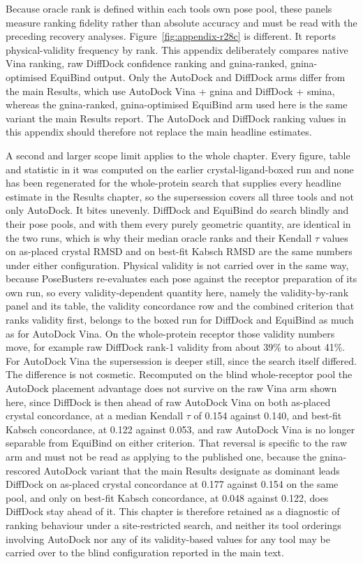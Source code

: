 Because oracle rank is defined within each tool\textquotesingle s own pose pool, these panels measure ranking fidelity rather than absolute accuracy and must be read with the preceding recovery analyses. Figure~\ref{fig:appendix-r28c} is different. It reports physical-validity frequency by rank. This appendix deliberately compares native Vina ranking, raw DiffDock confidence ranking and gnina-ranked, gnina-optimised EquiBind output. Only the AutoDock and DiffDock arms differ from the main Results, which use AutoDock Vina + gnina and DiffDock + smina, whereas the gnina-ranked, gnina-optimised EquiBind arm used here is the same variant the main Results report. The AutoDock and DiffDock ranking values in this appendix should therefore not replace the main headline estimates.

A second and larger scope limit applies to the whole chapter. Every figure, table and statistic in it was computed on the earlier crystal-ligand-boxed run and none has been regenerated for the whole-protein search that supplies every headline estimate in the Results chapter, so the supersession covers all three tools and not only AutoDock. It bites unevenly. DiffDock and EquiBind do search blindly and their pose pools, and with them every purely geometric quantity, are identical in the two runs, which is why their median oracle ranks and their Kendall \ensuremath{\tau} values on as-placed crystal RMSD and on best-fit Kabsch RMSD are the same numbers under either configuration. Physical validity is not carried over in the same way, because PoseBusters re-evaluates each pose against the receptor preparation of its own run, so every validity-dependent quantity here, namely the validity-by-rank panel and its table, the validity concordance row and the combined criterion that ranks validity first, belongs to the boxed run for DiffDock and EquiBind as much as for AutoDock Vina. On the whole-protein receptor those validity numbers move, for example raw DiffDock rank-1 validity from about 39\% to about 41\%. For AutoDock Vina the supersession is deeper still, since the search itself differed. The difference is not cosmetic. Recomputed on the blind whole-receptor pool the AutoDock placement advantage does not survive on the raw Vina arm shown here, since DiffDock is then ahead of raw AutoDock Vina on both as-placed crystal concordance, at a median Kendall \ensuremath{\tau} of 0.154 against 0.140, and best-fit Kabsch concordance, at 0.122 against 0.053, and raw AutoDock Vina is no longer separable from EquiBind on either criterion. That reversal is specific to the raw arm and must not be read as applying to the published one, because the gnina-rescored AutoDock variant that the main Results designate as dominant leads DiffDock on as-placed crystal concordance at 0.177 against 0.154 on the same pool, and only on best-fit Kabsch concordance, at 0.048 against 0.122, does DiffDock stay ahead of it. This chapter is therefore retained as a diagnostic of ranking behaviour under a site-restricted search, and neither its tool orderings involving AutoDock nor any of its validity-based values for any tool may be carried over to the blind configuration reported in the main text.

